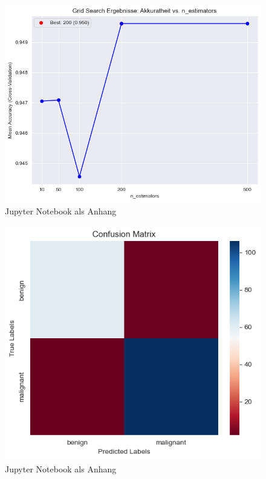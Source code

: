 \documentclass[a4paper,12pt]{article}
\begin{document}
\begin{figure}[H]
    \centering
    \includegraphics[width=\textwidth]{gridcodeForest.png}
    \caption{Jupyter Notebook als Anhang}
    \label{fig:gcforest}
\end{figure}
\begin{figure}[H]
    \centering
    \includegraphics[width=\textwidth]{confforest.png}
    \caption{Jupyter Notebook als Anhang}
    \label{fig:confforest}
\end{figure}
\end{document}

